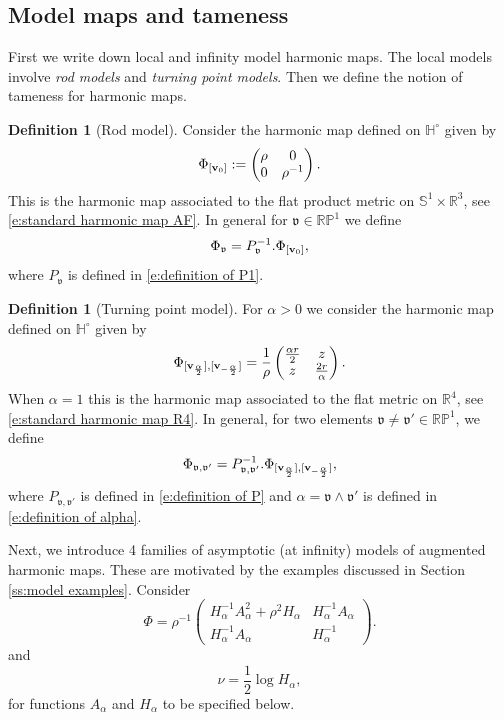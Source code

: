 \documentclass[a4paper,11pt]{amsart}
\theoremstyle{definition}
\newtheorem{definition}[theorem]{Definition}
\numberwithin{equation}{section}
\newcommand{\dH}{\mathbb{H}}
\newcommand{\R}{\mathbb{R}}
\newcommand{\dP}{\mathbb{P}}
\newcommand{\dS}{\mathbb{S}}
\newcommand{\mv} {\mathfrak v}
\DeclareMathOperator{\bv}{{\bf v}}
\begin{document}
\subsection{Model maps and tameness}\label{ss:model maps and tameness}First we write down local and infinity model harmonic maps. The local models involve \emph{rod models} and \emph{turning point models}. Then we define the notion of tameness for harmonic maps.
\begin{definition}[Rod model]
Consider the harmonic map defined on $\dH^\circ$ given by
  $$\Phi_{[\bv_0]}:=\left(\begin{matrix}
			     \rho&0\\0&\rho^{-1}
		    \end{matrix}\right).$$
		    This is the harmonic map associated to the flat product metric on $\dS^1\times \R^3$, see \eqref{e:standard harmonic map AF}. 
		    In general for $\mv\in \R\dP^1$  we define
\begin{equation} \label{e: definition of rod model}
	\Phi_{\mv}=P_\mv^{-1}. \Phi_{[\bv_0]}, 
\end{equation}
where $P_\mv$ is defined in \eqref{e:definition of P1}.
\end{definition} 


\begin{definition}[Turning point model]
For $\alpha>0$ we consider the harmonic map defined on $\dH^\circ$ given by
	 \begin{equation}\label{e:turning point model}
	\Phi_{[\bv_{\frac{\alpha}{2}}], [\bv_{-\frac{\alpha}{2}}]}=\frac{1}{\rho}\left(\begin{matrix}
		\frac{\alpha r}{2} & z\\
		z & \frac{2r}{\alpha}
	\end{matrix}\right).
\end{equation}
When $\alpha=1$ this is the harmonic map associated to the flat metric on $\R^4$, see \eqref{e:standard harmonic map R4}. 
In general, for two elements $\mv\neq \mv'\in \R\mathbb P^1$, we define $$\Phi_{\mv, \mv'}=P_{\mv, \mv'}^{-1}. \Phi_{[\bv_{\frac{\alpha}{2}}], [\bv_{-\frac{\alpha}{2}}]},$$ where  $P_{\mv, \mv'}$ is  defined in \eqref{e:definition of P} and $\alpha=\mv\wedge\mv'$ is defined in \eqref{e:definition of alpha}.
\end{definition}

Next, we introduce 4 families of asymptotic (at infinity) models of augmented harmonic maps. These are motivated by the examples discussed in Section \ref{ss:model examples}.
Consider  
\begin{equation}\label{eq:Phi with alpha}
\Phi=\rho^{-1}\left(\begin{matrix}H_\alpha^{-1}A_\alpha^2+\rho^2H_\alpha& H_\alpha^{-1}A_\alpha\\ H_\alpha^{-1}A_\alpha & H_\alpha^{-1}\end{matrix}\right).
\end{equation}
and 
\begin{equation}\label{eq:nu with alpha}
    \nu=\frac{1}{2}\log H_\alpha,
\end{equation}
for functions $A_\alpha$ and $H_\alpha$ to be specified below.
\end{document}

